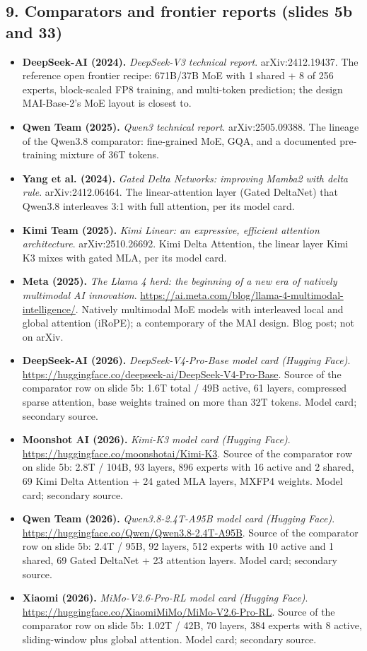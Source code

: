 \documentclass[11pt,letterpaper]{article}
\begin{document}
\subsection*{9. Comparators and frontier reports (slides 5b and 33)}
\begin{itemize}[leftmargin=1.2em,itemsep=3pt]\sloppy
\item \textbf{DeepSeek-AI (2024).} \textit{DeepSeek-V3 technical report}. arXiv:2412.19437. The reference open frontier recipe: 671B/37B MoE with 1 shared + 8 of 256 experts, block-scaled FP8 training, and multi-token prediction; the design MAI-Base-2's MoE layout is closest to.
\item \textbf{Qwen Team (2025).} \textit{Qwen3 technical report}. arXiv:2505.09388. The lineage of the Qwen3.8 comparator: fine-grained MoE, GQA, and a documented pre-training mixture of 36T tokens.
\item \textbf{Yang et al. (2024).} \textit{Gated Delta Networks: improving Mamba2 with delta rule}. arXiv:2412.06464. The linear-attention layer (Gated DeltaNet) that Qwen3.8 interleaves 3:1 with full attention, per its model card.
\item \textbf{Kimi Team (2025).} \textit{Kimi Linear: an expressive, efficient attention architecture}. arXiv:2510.26692. Kimi Delta Attention, the linear layer Kimi K3 mixes with gated MLA, per its model card.
\item \textbf{Meta (2025).} \textit{The Llama 4 herd: the beginning of a new era of natively multimodal AI innovation}. \url{https://ai.meta.com/blog/llama-4-multimodal-intelligence/}. Natively multimodal MoE models with interleaved local and global attention (iRoPE); a contemporary of the MAI design. Blog post; not on arXiv.
\item \textbf{DeepSeek-AI (2026).} \textit{DeepSeek-V4-Pro-Base model card (Hugging Face)}. \url{https://huggingface.co/deepseek-ai/DeepSeek-V4-Pro-Base}. Source of the comparator row on slide 5b: 1.6T total / 49B active, 61 layers, compressed sparse attention, base weights trained on more than 32T tokens. Model card; secondary source.
\item \textbf{Moonshot AI (2026).} \textit{Kimi-K3 model card (Hugging Face)}. \url{https://huggingface.co/moonshotai/Kimi-K3}. Source of the comparator row on slide 5b: 2.8T / 104B, 93 layers, 896 experts with 16 active and 2 shared, 69 Kimi Delta Attention + 24 gated MLA layers, MXFP4 weights. Model card; secondary source.
\item \textbf{Qwen Team (2026).} \textit{Qwen3.8-2.4T-A95B model card (Hugging Face)}. \url{https://huggingface.co/Qwen/Qwen3.8-2.4T-A95B}. Source of the comparator row on slide 5b: 2.4T / 95B, 92 layers, 512 experts with 10 active and 1 shared, 69 Gated DeltaNet + 23 attention layers. Model card; secondary source.
\item \textbf{Xiaomi (2026).} \textit{MiMo-V2.6-Pro-RL model card (Hugging Face)}. \url{https://huggingface.co/XiaomiMiMo/MiMo-V2.6-Pro-RL}. Source of the comparator row on slide 5b: 1.02T / 42B, 70 layers, 384 experts with 8 active, sliding-window plus global attention. Model card; secondary source.
\end{itemize}
\clearpage
\printindex
\end{document}

